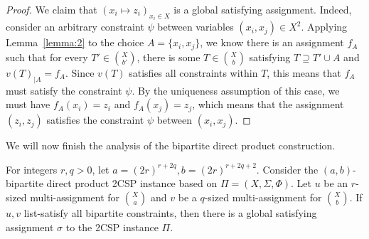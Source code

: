 \begin{proof}
    We claim that $\left(x_i \mapsto z_i\right)_{x_i \in X}$ is a global satisfying assignment. 
    Indeed, consider an arbitrary 
     constraint $\psi$ between variables $(x_i,x_j) \in X^2$. Applying Lemma~\ref{lemma:2} to the choice $A=\{x_i,x_j\}$, we know there is an assignment $f_A$ such that for every $T' \in \binom{X}{b'}$, there is some $T \in \binom{X}{b}$ satisfying $T \supseteq T' \cup A$ and $v(T)_{|A}=f_A$. Since $v(T)$ satisfies all constraints within $T$, this means that $f_A$ must satisfy the constraint $\psi$. By the uniqueness assumption of this case, we must have $f_A(x_i)=z_i$ and $f_A(x_j) = z_j$, which means that the assignment $(z_i,z_j)$ satisfies the constraint $\psi$ between $(x_i,x_j)$. 
\end{proof}

We will now finish the analysis of the bipartite direct product construction.
\begin{lemma}
\label{lem:final-baby}

For integers $r,q>0$, let $a=(2r)^{r+2q}, b=(2r)^{r+2q+2}$. Consider the $(a,b)$-bipartite direct product 2CSP instance based on $\Pi=(X,\Sigma,\Phi)$. Let $u$ be an $r$-sized multi-assignment for $\binom{X}{a}$ and $v$ be a $q$-sized multi-assignment for $\binom{X}{b}$. If $u,v$ list-satisfy all bipartite constraints, then there is a global satisfying assignment $\sigma$ to  the 2CSP instance $\Pi$.

\end{lemma}

